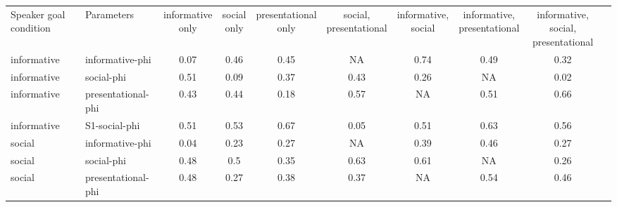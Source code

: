 \documentclass[12pt]{article}
\begin{document}
\begin{landscape}
\begin{table}[]
\centering
\begin{tabular}{llcccccccc}
Speaker goal condition & Parameters              & \thead{informative \\only} & \thead{social \\only} &  \thead{presentational \\only} & \thead{social, \\presentational} & \thead{informative, \\social} & \thead{informative, \\presentational} & \thead{informative, social, \\presentational} \\
informative            & informative-phi    & 0.07             & 0.46        & 0.45                & NA                     & 0.74                & 0.49                        & 0.32                                \\
informative            & social-phi         & 0.51             & 0.09        & 0.37                & 0.43                   & 0.26                & NA                          & 0.02                                \\
informative            & presentational-phi & 0.43             & 0.44        & 0.18                & 0.57                   & NA                  & 0.51                        & 0.66                                \\
informative            & S1-social-phi      & 0.51             & 0.53        & 0.67                & 0.05                   & 0.51                & 0.63                        & 0.56                                \\
social                 & informative-phi    & 0.04             & 0.23        & 0.27                & NA                     & 0.39                & 0.46                        & 0.27                                \\
social                 & social-phi         & 0.48             & 0.5         & 0.35                & 0.63                   & 0.61                & NA                          & 0.26                                \\
social                 & presentational-phi & 0.48             & 0.27        & 0.38                & 0.37                   & NA                  & 0.54                        & 0.46                                \\

\end{tabular}
\end{table}
\end{landscape}
\end{document}
